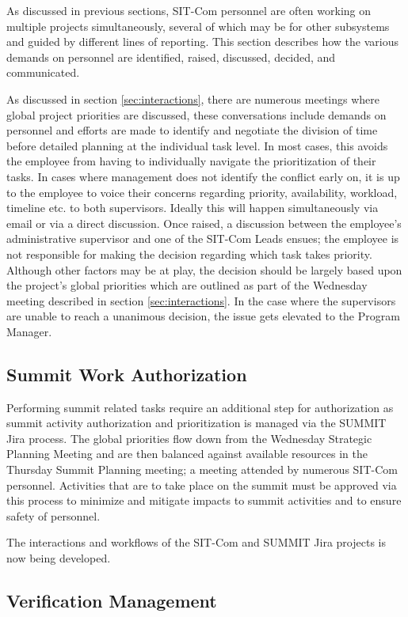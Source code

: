 \documentclass[SE,lsstdraft,authoryear,toc]{lsstdoc}
\begin{document}
As discussed in previous sections, SIT-Com personnel are often working on multiple projects simultaneously, several of which may be for other subsystems and guided by different lines of reporting.
This section describes how the various demands on personnel are identified, raised, discussed, decided, and communicated.

As discussed in section \ref{sec:interactions}, there are numerous meetings where global project priorities are discussed, these conversations include demands on personnel and efforts are made to identify and negotiate the division of time before detailed planning at the individual task level.
In most cases, this avoids the employee from having to individually navigate the prioritization of their tasks.
In cases where management does not identify the conflict early on, it is up to the employee to voice their concerns regarding priority, availability, workload, timeline etc. to both supervisors.
Ideally this will happen simultaneously via email or via a direct discussion.
Once raised, a discussion between the employee's administrative supervisor and one of the SIT-Com Leads ensues; the employee is not responsible for making the decision regarding which task takes priority.
Although other factors may be at play, the decision should be largely based upon the project's global priorities which are outlined as part of the Wednesday meeting described in section \ref{sec:interactions}.
In the case where the supervisors are unable to reach a unanimous decision, the issue gets elevated to the Program Manager.

\subsection{Summit Work Authorization}
Performing summit related tasks require an additional step for authorization as summit activity authorization and prioritization is managed via the SUMMIT Jira process.
The global priorities flow down from the Wednesday Strategic Planning Meeting and are then balanced against available resources in the Thursday Summit Planning meeting; a meeting attended by numerous SIT-Com personnel.
Activities that are to take place on the summit must be approved via this process to minimize and mitigate impacts to summit activities and to ensure safety of personnel.

The interactions and workflows of the SIT-Com and SUMMIT Jira projects is now being developed.

\subsection{Verification Management}
\end{document}
